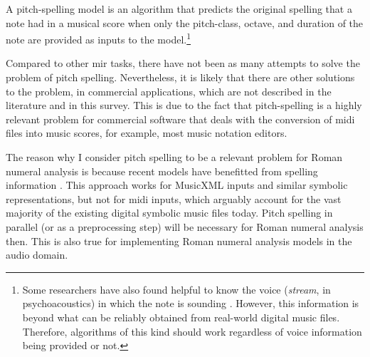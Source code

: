 

A pitch-spelling model is an algorithm that predicts the
original spelling that a note had in a musical score when
only the pitch-class, octave, and duration of the note are
provided as inputs to the model.\footnote{Some researchers
have also found helpful to know the voice (\emph{stream}, in
psychoacoustics) in which the note is sounding
\parencite{teodoru2007pitch}. However, this information is
beyond what can be reliably obtained from real-world digital
music files. Therefore, algorithms of this kind should work
regardless of voice information being provided or not.}


Compared to other \gls{mir} tasks, there have not been as
many attempts to solve the problem of pitch spelling.
Nevertheless, it is likely that there are other solutions to
the problem, in commercial applications, which are not
described in the literature and in this survey. This is due
to the fact that pitch-spelling is a highly relevant problem
for commercial software that deals with the conversion of
\gls{midi} files into music scores, for example, most music
notation editors.

The reason why I consider pitch spelling to be a relevant
problem for Roman numeral analysis is because recent models
have benefitted from spelling information
\parencite{micchi2020not}. This approach works for MusicXML
inputs and similar symbolic representations, but not for
\gls{midi} inputs, which arguably account for the vast
majority of the existing digital symbolic music files today.
Pitch spelling in parallel (or as a preprocessing step) will
be necessary for Roman numeral analysis then. This is also
true for implementing Roman numeral analysis models in the
audio domain.
